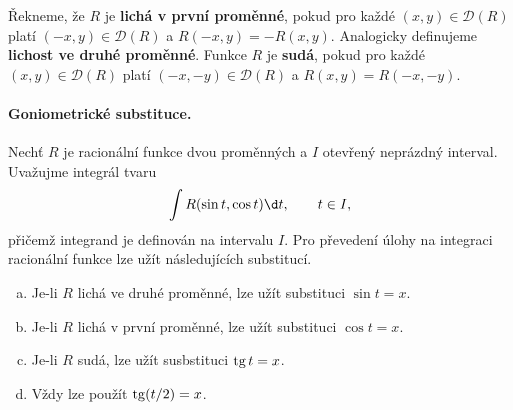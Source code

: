 \begin{definice}
Řekneme, že $R$ je \textbf{lichá v první proměnné}, pokud pro každé $(x,y)\in \mathcal D(R)$
platí $(-x,y)\in \mathcal D(R)$ a $R(-x,y) = -R(x,y)$. Analogicky definujeme \textbf{lichost ve druhé proměnné}.
Funkce $R$ je \textbf{sudá}, pokud pro každé $(x,y)\in \mathcal D(R)$ platí $(-x,-y)\in \mathcal D(R)$ a $R(x,y) = R(-x,-y)$.
\end{definice}

\paragraph{Goniometrické substituce.} Nechť $R$ je racionální funkce dvou proměnných a $I$ otevřený neprázdný interval.
Uvažujme integrál tvaru
\[
\int R(\sin t, \cos t)\d t, \qquad t \in I,
\]
přičemž integrand je definován na intervalu $I$. Pro převedení úlohy na integraci racionální funkce
lze užít následujících substitucí.
\begin{enumerate}[(a)]
	\item Je-li $R$ lichá ve druhé proměnné, lze užít substituci $\sin t = x$.
\item Je-li $R$ lichá v první proměnné, lze užít substituci $\cos t = x$.
\item Je-li $R$ sudá, lze užít susbstituci $\operatorname{tg} t = x$.
\item Vždy lze použít $\operatorname{tg}(t/2) = x$.
\end{enumerate}

